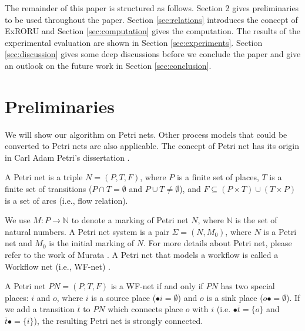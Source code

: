 \documentclass{llncs}
\begin{document}
The remainder of this paper is structured as follows. Section 2 gives preliminaries to be used throughout the paper. Section \ref{sec:relations} introduces the concept of ExRORU and Section \ref{sec:computation} gives the computation. The results of the experimental evaluation are shown in Section \ref{sec:experiments}. Section \ref{sec:discussion} gives some deep discussions before we conclude the paper and give an outlook on the future work in Section \ref{sec:conclusion}.

\section{Preliminaries}\label{sec:preliminaries}
We will show our algorithm on Petri nets. Other process models that could be converted to Petri nets are also applicable. The concept of Petri net has its origin in Carl Adam Petri's dissertation \cite{petri1966kommunikation}.

\begin{definition}\label{def:petrinet}
A Petri net is a triple $N=(P,T,F)$, where $P$ is a finite set of places, $T$ is a finite set of transitions ($P\cap T=\emptyset$ and $P\cup T\neq\emptyset$), and $F\subseteq(P\times T)\cup(T\times P)$ is a set of arcs (i.e., flow relation).
\end{definition}

We use $M:P\rightarrow\mathbb{N}$ to denote a marking of Petri net $N$, where $\mathbb{N}$ is the set of natural numbers. A Petri net system is a pair $\Sigma=(N,M_{0})$, where $N$ is a Petri net and $M_{0}$ is the initial marking of $N$. For more details about Petri net, please refer to the work of Murata \cite{murata1989petri}. A Petri net that models a workflow is called a Workflow net (i.e., WF-net) \cite{van1998application}.

\begin{definition}[WF-net]\label{def:wfnet}
A Petri net $PN=(P,T,F)$ is a WF-net if and only if $PN$ has two special places: $i$ and $o$, where $i$ is a source place ($\bullet i=\emptyset$) and $o$ is a sink place ($o\bullet =\emptyset$). If we add a transition $\overline{t}$ to $PN$ which connects place $o$ with $i$ (i.e. $\bullet \overline{t}=\{o\}$ and $\overline{t}\bullet=\{i\}$), the resulting Petri net is strongly connected.
\end{definition}
\end{document}
